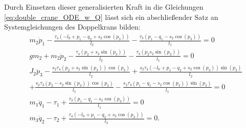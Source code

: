 Durch Einsetzen dieser generalisierten Kraft in die Gleichungen \eqref{eq:double_crane_ODE_w_Q} lässt sich ein abschließender Satz an Systemgleichungen des Doppelkrans bilden:
\begin{subequations}
	\label{double_flat_syseqs}
	\begin{flalign}
	&m_{2} \ddot{p}_{1} - \frac{\tau_{4} \left(- l_{0} + p_{1} - q_{2} + s_{2} \cos{\left(p_{3} \right)}\right)}{l_{2}} - \frac{\tau_{3} \left(p_{1} - q_{1} - s_{2} \cos{\left(p_{3} \right)}\right)}{l_{1}} = 0 \label{double_flat_syseq1}\\
	&g m_{2} + m_{2} \ddot{p}_{2} - \frac{\tau_{4} \left(p_{2} + s_{2} \sin{\left(p_{3} \right)}\right)}{l_{2}} - \frac{\tau_{3} \left(p_{2} s_{2} \sin{\left(p_{3} \right)}\right)}{l_{1}} = 0 \label{double_flat_syseq2}\\
	&J_{2} \ddot{p}_{3} - \frac{s_{2} \tau_{4} \left(p_{2} + s_{2} \sin{\left(p_{3} \right)}\right) \cos{\left(p_{3} \right)}}{l_{2}} + \frac{s_{2} \tau_{4} \left(- l_{0} + p_{1} - q_{2} + s_{2} \cos{\left(p_{3} \right)}\right) \sin{\left(p_{3} \right)}}{l_{2}} \nonumber\\
	&+ \frac{s_{2} \tau_{3} \left(p_{2} - s_{2} \sin{\left(p_{3} \right)}\right) \cos{\left(p_{3} \right)}}{l_{1}} - \frac{s_{2} \tau_{3} \left(p_{1} - q_{1} - s_{2} \cos{\left(p_{3} \right)}\right) \sin{\left(p_{3} \right)}}{l_{1}} = 0 \label{double_flat_syseq3}\\
	&m_{1} \ddot{q}_{1} - \tau_{1} + \frac{\tau_{3} \left(p_{1} - q_{1} - s_{2} \cos{\left(p_{3} \right)}\right)}{l_{1}} = 0 \label{double_flat_syseq4}\\
	&m_{3} \ddot{q}_{2} - \tau_{2} + \frac{\tau_{4} \left(- l_{0} + p_{1} - q_{2} + s_{2} \cos{\left(p_{3} \right)}\right)}{l_{2}} = 0\label{double_flat_syseq5}.
	\end{flalign}
\end{subequations}

